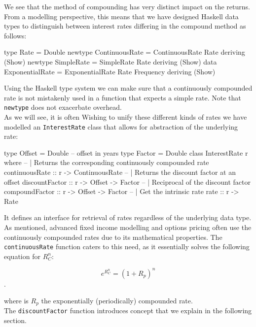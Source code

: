 We see that the method of compounding has very distinct impact on the returns.
From a modelling perspective, this means that we have designed Haskell
data types to distinguish between interest rates differing in the compound
method as follows:

\begin{hscode}
type Rate = Double
newtype ContinuousRate = ContinuousRate Rate deriving (Show)
newtype SimpleRate     = SimpleRate Rate deriving (Show)
data ExponentialRate   = ExponentialRate Rate Frequency deriving (Show)
\end{hscode}

Using the Haskell type system we can make sure that a continuously compounded
rate is not mistakenly used in a function that expects a simple rate.
Note that \texttt{newtype} does not exacerbate overhead.\\

As we will see, it is often
Wishing to unify these different kinds of rates we have modelled an
\texttt{InterestRate} class that allows for abstraction of the underlying rate:


\begin{hscode}
type Offset         = Double -- offset in years
type Factor = Double
class InterestRate r where
  -- | Returns the corresponding continuously compounded rate
  continuousRate :: r -> ContinuousRate
  -- | Returns the discount factor at an offset
  discountFactor :: r -> Offset -> Factor 
  -- | Reciprocal of the discount factor
  compoundFactor :: r -> Offset -> Factor 
  -- | Get the intrinsic rate
  rate           :: r -> Rate
\end{hscode}

It defines an interface for retrieval of rates regardless of the underlying
data type. As mentioned, advanced fixed income modelling and options pricing
often use the continuously compounded rates due to its mathematical 
properties\cite{HULL}. The \texttt{continuousRate} function caters to this
need, as it essentially solves the following equation for $R_C^n$:

\begin{equation}
e^{R_C^n} = (1+R_p)^n
\end{equation}.

where is $R_p$ the exponentially (periodically) compounded rate.\\

The \texttt{discountFactor} function introduces concept that we
explain in the following section.

